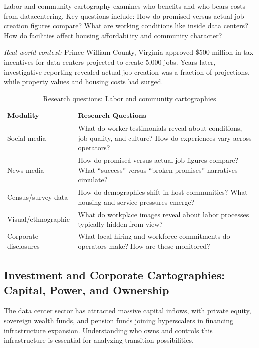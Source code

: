\documentclass[review]{elsarticle}
\begin{document}
Labor and community cartography examines who benefits and who bears costs from datacentering. Key questions include: How do promised versus actual job creation figures compare? What are working conditions like inside data centers? How do facilities affect housing affordability and community character?

\textit{Real-world context:} Prince William County, Virginia approved \$500 million in tax incentives for data centers projected to create 5,000 jobs. Years later, investigative reporting revealed actual job creation was a fraction of projections, while property values and housing costs had surged.

\begin{table}[h]
\caption{Research questions: Labor and community cartographies}
\label{tab:labor}
\begin{tabular}{p{3cm}p{9cm}}
\toprule
\textbf{Modality} & \textbf{Research Questions} \\
\midrule
Social media & What do worker testimonials reveal about conditions, job quality, and culture? How do experiences vary across operators? \\
\addlinespace
News media & How do promised versus actual job figures compare? What ``success'' versus ``broken promises'' narratives circulate? \\
\addlinespace
Census/survey data & How do demographics shift in host communities? What housing and service pressures emerge? \\
\addlinespace
Visual/ethnographic & What do workplace images reveal about labor processes typically hidden from view? \\
\addlinespace
Corporate disclosures & What local hiring and workforce commitments do operators make? How are these monitored? \\
\bottomrule
\end{tabular}
\end{table}

\subsection{Investment and Corporate Cartographies: Capital, Power, and Ownership}

The data center sector has attracted massive capital inflows, with private equity, sovereign wealth funds, and pension funds joining hyperscalers in financing infrastructure expansion. Understanding who owns and controls this infrastructure is essential for analyzing transition possibilities.
\end{document}

